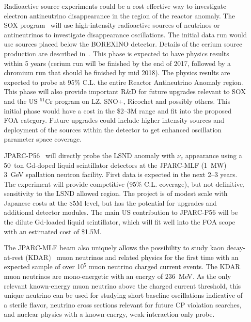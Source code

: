 \noindent Radioactive source experiments could be a cost effective way
to investigate electron antineutrino disappearance in the region of
the reactor anomaly. The SOX program~\cite{bib:SOX} will use
high-intensity radioactive sources of neutrinos or antineutrinos to
investigate disappearance oscillations. The initial data run would
use sources placed below the BOREXINO detector. Details of the cerium
source production are described in~\cite{bib:CL}. This phase is
expected to have physics results within 5 years (cerium run will be
finished by the end of 2017, followed by a chromium run that should be
finished by mid 2018). The physics results are expected to probe at
95\% C.L. the entire Reactor Antineutrino Anomaly region. This phase
will also provide important R\&D for future upgrades relevant to SOX
and the US $^{51}$Cr program on LZ, SNO+, Ricochet and possibly
others. This initial phase would have a cost in
the \$2--3M range and fit into the proposed FOA category. 
Future upgrades could include higher intensity sources and deployment
of the sources within the detector to get enhanced oscillation
parameter space coverage.


\noindent JPARC-P56~\cite{JPARC_P_56} will directly probe the LSND
anomaly with $\bar\nu_e$ appearance using a 50~ton Gd-doped liquid
scintillator detectors at the JPARC-MLF (1~MW) 3~GeV spallation neutron
facility. First data is expected in the next 2--3 years. The
experiment will provide competitive (95\% C.L. coverage), but not
definitive, sensitivity to the LSND allowed region. The project is of
modest scale with Japanese costs at the \$5M level, but has the
potential for upgrades and additional detector modules. The main US
contribution to JPARC-P56 will be the dilute Gd-loaded liquid
scintillator, which will fit well into the FOA scope with an estimated
cost of \$1.5M.

The JPARC-MLF beam also uniquely allows the possibility to study kaon
decay-at-rest (KDAR)~\cite{KDAR} muon neutrinos 
and related physics for the first time with an expected sample of over 10$^5$ muon
neutrino charged current events. The KDAR muon neutrinos are
mono-energetic with an energy of 236~MeV. As the only relevant
known-energy muon neutrino above the charged current threshold, this
unique neutrino can be used for studying short baseline oscillations
indicative of a sterile flavor, neutrino cross sections relevant for
future CP violation searches, and nuclear physics with a known-energy,
weak-interaction-only probe.


